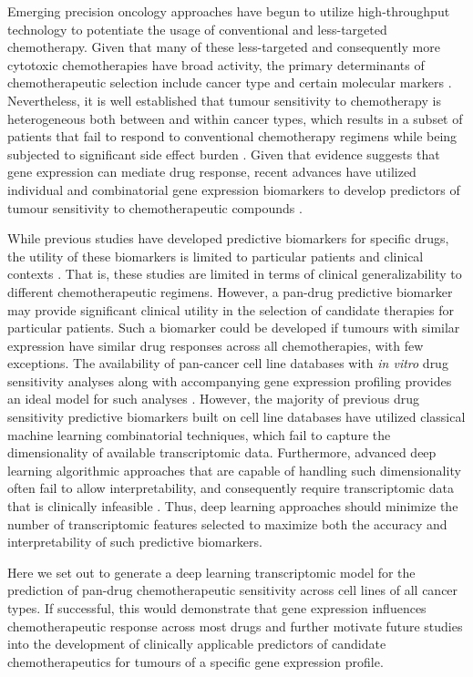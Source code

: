 \documentclass[10pt, letterpaper, twocolumn]{article}
\begin{document}
Emerging precision oncology approaches have begun to utilize high-throughput technology to potentiate the usage of conventional and less-targeted chemotherapy. Given that many of these less-targeted and consequently more cytotoxic chemotherapies have broad activity, the primary determinants of chemotherapeutic selection include cancer type and certain molecular markers \cite{adverse}. Nevertheless, it is well established that tumour sensitivity to chemotherapy is heterogeneous both between and within cancer types, which results in a subset of patients that fail to respond to conventional chemotherapy regimens while being subjected to significant side effect burden \cite{adjuvant}. Given that evidence suggests that gene expression can mediate drug response, recent advances have utilized individual and combinatorial gene expression biomarkers to develop predictors of tumour sensitivity to chemotherapeutic compounds \cite{integrated}.

While previous studies have developed predictive biomarkers for specific drugs, the utility of these biomarkers is limited to particular patients and clinical contexts \cite{drug_sense}. That is, these studies are limited in terms of clinical generalizability to different chemotherapeutic regimens. However, a pan-drug predictive biomarker may provide significant clinical utility in the selection of candidate therapies for particular patients. Such a biomarker could be developed if tumours with similar expression have similar drug responses across all chemotherapies, with few exceptions. The availability of pan-cancer cell line databases with \textit{in vitro} drug sensitivity analyses along with accompanying gene expression profiling provides an ideal model for such analyses \cite{gdsc}. However, the majority of previous drug sensitivity predictive biomarkers built on cell line databases have utilized classical machine learning combinatorial techniques, which fail to capture the dimensionality of available transcriptomic data. Furthermore, advanced deep learning algorithmic approaches that are capable of handling such dimensionality often fail to allow interpretability, and consequently require transcriptomic data that is clinically infeasible \cite{ml_oncol}. Thus, deep learning approaches should minimize the number of transcriptomic features selected to maximize both the accuracy and interpretability of such predictive biomarkers.

Here we set out to generate a deep learning transcriptomic model for the prediction of pan-drug chemotherapeutic sensitivity across cell lines of all cancer types. If successful, this would demonstrate that gene expression influences chemotherapeutic response across most drugs and further motivate future studies into the development of clinically applicable predictors of candidate chemotherapeutics for tumours of a specific gene expression profile.
\end{document}
